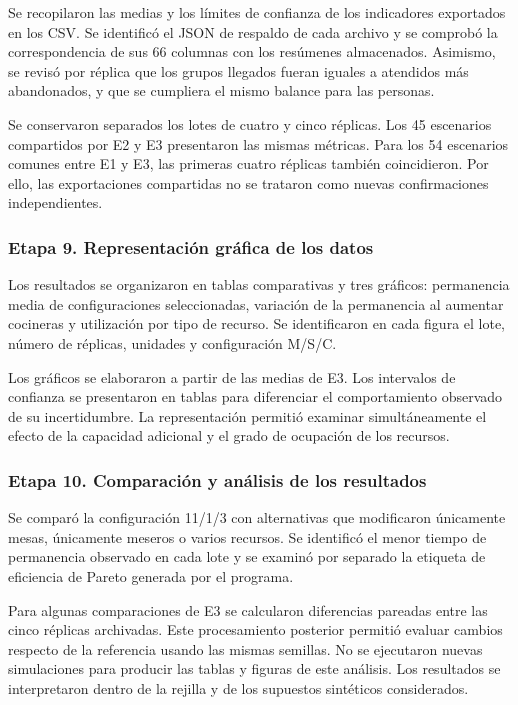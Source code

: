 \documentclass[10pt,a4paper,twocolumn]{article}
\begin{document}
Se recopilaron las medias y los límites de confianza de los indicadores exportados en los CSV. Se identificó el JSON de respaldo de cada archivo y se comprobó la correspondencia de sus 66 columnas con los resúmenes almacenados. Asimismo, se revisó por réplica que los grupos llegados fueran iguales a atendidos más abandonados, y que se cumpliera el mismo balance para las personas.

Se conservaron separados los lotes de cuatro y cinco réplicas. Los 45 escenarios compartidos por E2 y E3 presentaron las mismas métricas. Para los 54 escenarios comunes entre E1 y E3, las primeras cuatro réplicas también coincidieron. Por ello, las exportaciones compartidas no se trataron como nuevas confirmaciones independientes.

\subsubsection*{Etapa 9. Representación gráfica de los datos}

Los resultados se organizaron en tablas comparativas y tres gráficos: permanencia media de configuraciones seleccionadas, variación de la permanencia al aumentar cocineras y utilización por tipo de recurso. Se identificaron en cada figura el lote, número de réplicas, unidades y configuración M/S/C.

Los gráficos se elaboraron a partir de las medias de E3. Los intervalos de confianza se presentaron en tablas para diferenciar el comportamiento observado de su incertidumbre. La representación permitió examinar simultáneamente el efecto de la capacidad adicional y el grado de ocupación de los recursos.

\subsubsection*{Etapa 10. Comparación y análisis de los resultados}

Se comparó la configuración 11/1/3 con alternativas que modificaron únicamente mesas, únicamente meseros o varios recursos. Se identificó el menor tiempo de permanencia observado en cada lote y se examinó por separado la etiqueta de eficiencia de Pareto generada por el programa.

Para algunas comparaciones de E3 se calcularon diferencias pareadas entre las cinco réplicas archivadas. Este procesamiento posterior permitió evaluar cambios respecto de la referencia usando las mismas semillas. No se ejecutaron nuevas simulaciones para producir las tablas y figuras de este análisis. Los resultados se interpretaron dentro de la rejilla y de los supuestos sintéticos considerados.
\end{document}
